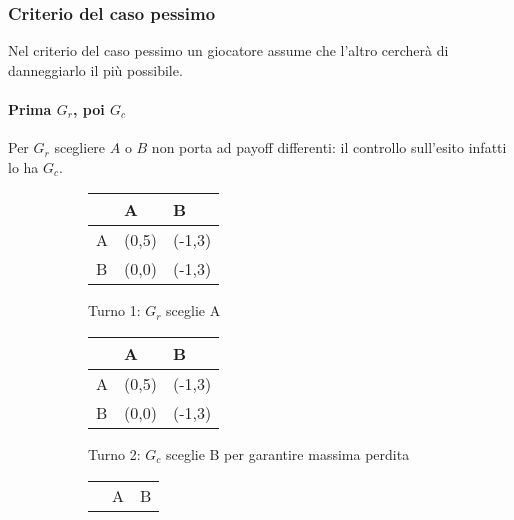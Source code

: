 \documentclass[\main/main.tex]{subfiles}
\begin{document}
\subsubsection*{Criterio del caso pessimo}
Nel criterio del caso pessimo un giocatore assume che l'altro cercherà di danneggiarlo il più possibile.
\paragraph*{Prima $G_r$, poi $G_c$}
Per $G_r$ scegliere $A$ o $B$ non porta ad payoff differenti: il controllo sull'esito infatti lo ha $G_c$.

\begin{figure}
  \begin{subfigure}{0.24\textwidth}
    \begin{table}
      \begin{tabular}{|L|L|L|}
        \hline
          & A                         & B                          \\
        \hline
        A &  (0,5) &  (-1,3) \\
        \hline
        B & (0,0)                     & (-1,3)                     \\
        \hline
      \end{tabular}
    \end{table}
    \caption{Turno 1: $G_r$ sceglie A}
  \end{subfigure}
  \begin{subfigure}{0.24\textwidth}
    \begin{table}
      \begin{tabular}{|L|L|L|}
        \hline
          & A                         & B                            \\
        \hline
        A &  (0,5) &  (-1,3) \\
        \hline
        B & (0,0)                     &  (-1,3)    \\
        \hline
      \end{tabular}
    \end{table}
    \caption{Turno 2: $G_c$ sceglie B per garantire massima perdita}
  \end{subfigure}
  \begin{subfigure}{0.24\textwidth}
    \begin{table}
      \begin{tabular}{|L|L|L|}
        \hline
          & A                         & B                         \\

\end{tabular}
\end{table}
\end{subfigure}
\end{figure}
\end{document}
